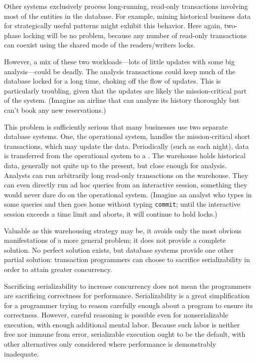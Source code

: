 Other systems exclusively process long-running, read-only transactions
involving most of the entities in the database.  For example, mining
historical business data for strategically useful patterns might exhibit
this behavior.  Here again, two-phase locking will be no problem,
because any number of read-only transactions can coexist using the
shared mode of the readers/writers locks.

However, a mix of these two workloads---lots of little updates with
some big analysis---could be deadly.  The analysis transactions could
keep much of the database locked for a long time, choking off the flow
of updates.  This is particularly troubling, given that the updates
are likely the mission-critical part of the system.  (Imagine an
airline that can analyze its history thoroughly but can't book any
new reservations.)

This problem is sufficiently serious that many businesses use two
separate database systems.  One, the operational system, handles the
mission-critical short transactions, which may update the data.
Periodically (such as each night), data is transferred from the
operational system to a .  The warehouse holds
historical data, generally not quite up to the present, but close
enough for analysis.  Analysts can run arbitrarily long read-only
transactions on the warehouse.  They can even directly run ad hoc
queries from an interactive session, something they would never dare
do on the operational system.  (Imagine an analyst who types in some
queries and then goes home without typing \verb|commit|; until the
interactive session exceeds a time limit and aborts, it will continue to hold locks.)

Valuable as this warehousing strategy may be, it avoids only the
most obvious manifestations of a more general problem;
it does not provide a complete solution.  No perfect solution
exists, but database systems provide one other partial solution:
transaction programmers can choose to sacrifice serializability in
order to attain greater concurrency.

Sacrificing serializability to increase concurrency does not mean the
programmers are sacrificing correctness for performance.
Serializability is a great simplification for a programmer trying to
reason carefully enough about a program to ensure its correctness.
However, careful reasoning is possible even for nonserializable
execution, with enough additional mental labor.  Because such labor is
neither free nor immune from error, serializable execution ought to be
the default, with other alternatives only considered where performance
is demonstrably inadequate.

